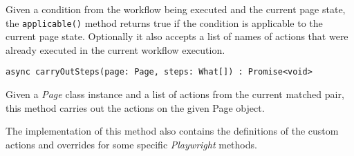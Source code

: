 Given a condition from the workflow being executed and the current page state, the \texttt{applicable()} method returns true if the condition is applicable to the current page state.
Optionally it also accepts a list of names of actions that were already executed in the current workflow execution.

\emptyline
\verb|async carryOutSteps(page: Page, steps: What[]) : Promise<void>|

\smallskip

Given a \textit{Page} class instance and a list of actions from the current matched pair, this method carries out the actions on the given Page object.

The implementation of this method also contains the definitions of the custom actions and overrides for some specific \textit{Playwright} methods.

